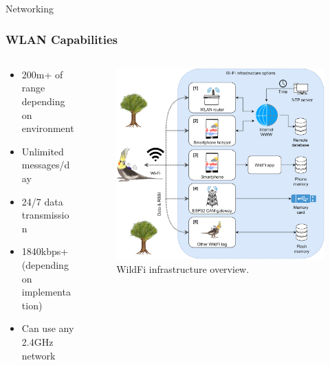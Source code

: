 \documentclass{beamer}
\begin{document}
  \begin{frame}{Networking}
    \frametitle{WLAN Capabilities}
    \begin{columns}
      \begin{column}{0.5\textwidth}
        \begin{itemize}
          \item 200m+ of range depending on environment
          \item Unlimited messages/day
          \item 24/7 data transmission
          \item 1840kbps+ (depending on implementation)
          \item Can use any 2.4GHz network
        \end{itemize}
      \end{column}
      \begin{column}{0.5\textwidth}
        \begin{figure}[htbp]
          \centering
          \includegraphics[width=\textwidth]{WildFi_IoT.jpg}
          \caption{WildFi infrastructure overview.\cite{wild2023internet}}
          \label{fig:WildFi_infrastructure_overview}
        \end{figure}
      \end{column}
    \end{columns}
  \end{frame}
\end{document}

